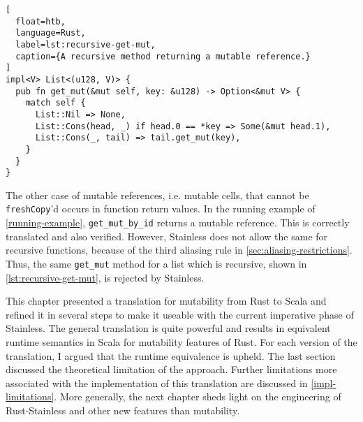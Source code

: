 \begin{lstlisting}[
  float=htb,
  language=Rust,
  label=lst:recursive-get-mut,
  caption={A recursive method returning a mutable reference.}
]
impl<V> List<(u128, V)> {
  pub fn get_mut(&mut self, key: &u128) -> Option<&mut V> {
    match self {
      List::Nil => None,
      List::Cons(head, _) if head.0 == *key => Some(&mut head.1),
      List::Cons(_, tail) => tail.get_mut(key),
    }
  }
}
\end{lstlisting}

The other case of mutable references, i.e. mutable cells, that cannot be
\lstinline!freshCopy!'d occurs in function return values. In the running example
of \autoref{running-example}, \lstinline!get_mut_by_id! returns a mutable
reference. This is correctly translated and also verified. However, Stainless
does not allow the same for recursive functions, because of the third aliasing
rule in \autoref{sec:aliasing-restrictions}. Thus, the same \lstinline!get_mut!
method for a list which is recursive, shown in \autoref{lst:recursive-get-mut},
is rejected by Stainless. \newpage

\hfill \break \noindent This chapter presented a translation for mutability from
Rust to Scala and refined it in several steps to make it useable with the
current imperative phase of Stainless. The general translation is quite powerful
and results in equivalent runtime semantics in Scala for mutability features of
Rust. For each version of the translation, I argued that the runtime equivalence
is upheld. The last section discussed the theoretical limitation of the
approach. Further limitations more associated with the implementation of this
translation are discussed in \autoref{impl-limitations}. More generally, the
next chapter sheds light on the engineering of Rust-Stainless and other new
features than mutability.
